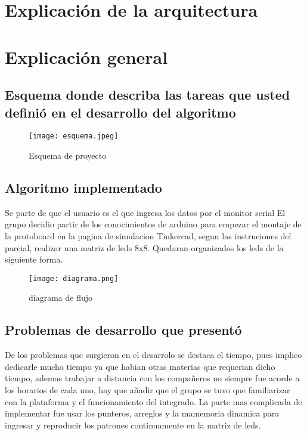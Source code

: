 \documentclass{article}
\begin{document}
\section{Explicación de la arquitectura}
\section{Explicación general}

\subsection{Esquema donde describa las tareas que usted definió en el desarrollo del algoritmo}
    \begin{figure}[h]
    \texttt{[image: esquema.jpeg]}
    \centering
    \caption{Esquema de proyecto}
    \label{fig:esquema}
    \end{figure}

\subsection{Algoritmo implementado}
Se parte de que el usuario es el que ingresa los datos por el monitor serial
El grupo decidio partir de los conocimientos de arduino para empezar el montaje de la protoboard en la pagina de simulacion Tinkercad, segun las instruciones del parcial, realizar una matriz de leds 8x8.
Quedaran organizados los leds de la siguiente forma.

    \begin{figure}[h]
    \texttt{[image: diagrama.png]}
    \centering
    \caption{diagrama de flujo}
    \label{fig:diagrama}
    \end{figure}

\subsection{Problemas de desarrollo que presentó}
De los problemas que surgieron en el desarrolo se destaca el tiempo, pues implico dedicarle mucho tiempo ya que habian otras materias que requerian dicho tiempo, ademas trabajar a distancia con los compañeros no siempre fue acorde a los horarios de cada uno, hay que añadir que el grupo se tuvo que familiarizar con la plataforma y el funcionamiento del integrado.
La parte mas complicada de implementar fue usar los punteros, arreglos y la mamemoria dinamica para ingresar y reproducir los patrones continuamente en la matriz de leds.
\end{document}
